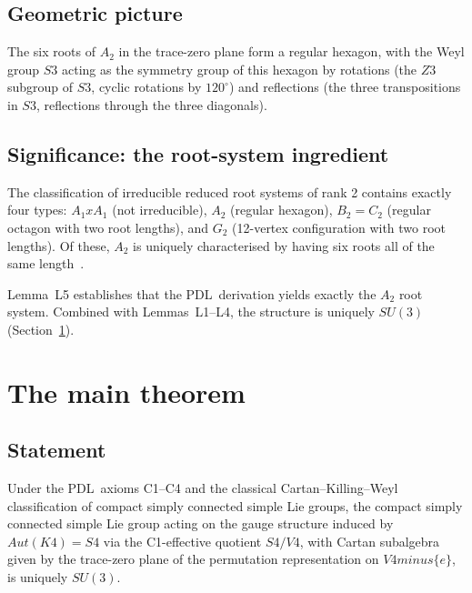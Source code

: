 \documentclass[11pt,a4paper]{article}
\def\Sfour{S4}%
\def\Vfour{V4}%
\def\Sthree{S3}%
\def\Zthree{Z3}%
\def\SUthree{SU(3)}%
\def\Kfour{K4}%
\def\PDL{PDL}%
\def\times{x}%
\def\setminus{ minus }%
\def\Aut{Aut}%
\def\mathbb#1{#1}%
\def\mathrm#1{#1}%
\def\textsc#1{#1}%
\theoremstyle{plain}
\theoremstyle{definition}
\theoremstyle{remark}
\newenvironment{theorembox}[1][]{%
  \begin{tcolorbox}[theoremstyle,title={Theorem\ifx\relax#1\relax\else: #1\fi}]}{\end{tcolorbox}}
\newcommand{\PDL}{\textsc{PDL}}
\newcommand{\Kfour}{K_4}
\newcommand{\Sfour}{S_4}
\newcommand{\Vfour}{V_4}
\newcommand{\Sthree}{S_3}
\newcommand{\Zthree}{\mathbb{Z}_3}
\newcommand{\SUthree}{\mathrm{SU}(3)}
\newcommand{\Aut}{\mathrm{Aut}}
\begin{document}
\subsection{Geometric picture}

The six roots of $A_2$ in the trace-zero plane form a regular hexagon, with the Weyl group $\Sthree$ acting as the symmetry group of this hexagon by rotations (the $\Zthree$ subgroup of $\Sthree$, cyclic rotations by $120^\circ$) and reflections (the three transpositions in $\Sthree$, reflections through the three diagonals).

\subsection{Significance: the root-system ingredient}

The classification of irreducible reduced root systems of rank 2 contains exactly four types: $A_1 \times A_1$ (not irreducible), $A_2$ (regular hexagon), $B_2 = C_2$ (regular octagon with two root lengths), and $G_2$ (12-vertex configuration with two root lengths). Of these, $A_2$ is uniquely characterised by having six roots all of the same length~\cite{Humphreys_Lie}.

Lemma~L5 establishes that the \PDL\ derivation yields exactly the $A_2$ root system. Combined with Lemmas~L1--L4, the structure is uniquely $\SUthree$ (Section~\ref{sec:main_theorem}).

\section{The main theorem}
\label{sec:main_theorem}

\subsection{Statement}

\begin{theorembox}[D58 main theorem --- $\SUthree$ from C1--C4]
\label{thm:D58_main}
Under the \PDL\ axioms C1--C4 and the classical Cartan--Killing--Weyl classification of compact simply connected simple Lie groups, the compact simply connected simple Lie group acting on the gauge structure induced by $\Aut(\Kfour) = \Sfour$ via the C1-effective quotient $\Sfour/\Vfour$, with Cartan subalgebra given by the trace-zero plane of the permutation representation on $\Vfour \setminus \{e\}$, is uniquely $\SUthree$.
\end{theorembox}
\end{document}
